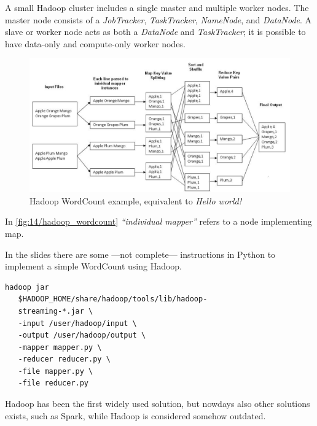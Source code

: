A small Hadoop cluster includes a single master and
multiple worker nodes.
The master node consists of a \textit{JobTracker}, \textit{TaskTracker},
\textit{NameNode}, and \textit{DataNode}.
A slave or worker node acts as both a \textit{DataNode} and
\textit{TaskTracker}; it is possible to have data-only and compute-only worker nodes.

\begin{figure}[htbp]
   \centering
   \includegraphics{images/14/hadoop_wordcount.png}
   \caption{Hadoop WordCount example, equivalent to \textit{Hello world!}}
   \label{fig:14/hadoop_wordcount}
\end{figure}
 In \autoref{fig:14/hadoop_wordcount} \textit{``individual mapper''} refers to a node implementing map.

In the slides there are some ---not complete--- instructions in Python to implement a simple WordCount using Hadoop.

\begin{lstlisting}[caption={Launching hadoop}]
   hadoop jar
   $HADOOP_HOME/share/hadoop/tools/lib/hadoop-
   streaming-*.jar \
   -input /user/hadoop/input \
   -output /user/hadoop/output \
   -mapper mapper.py \
   -reducer reducer.py \
   -file mapper.py \
   -file reducer.py
\end{lstlisting}

Hadoop has been the first widely used solution, but nowdays also other solutions exists, such as Spark, while Hadoop is considered somehow outdated.

